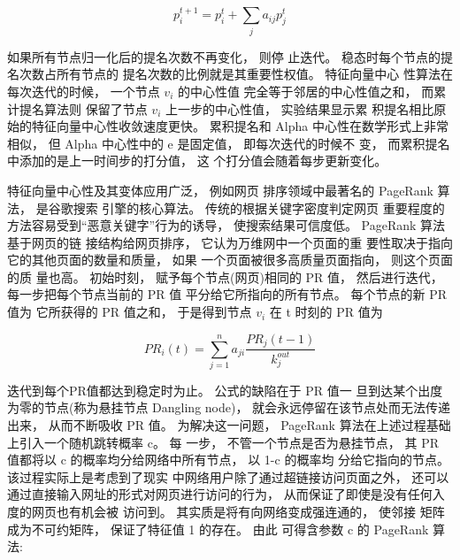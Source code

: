 \[p_i^{t + 1} = p_i^t + \sum\limits_j {{a_{ij}}p_j^t} \]

				如果所有节点归一化后的提名次数不再变化， 则停 止迭代。 稳态时每个节点的提名次数占所有节点的 提名次数的比例就是其重要性权值。 特征向量中心 性算法在每次迭代的时候， 一个节点 $v_i$ 的中心性值 完全等于邻居的中心性值之和， 而累计提名算法则 保留了节点 $v_i$ 上一步的中心性值， 实验结果显示累 积提名相比原始的特征向量中心性收敛速度更快。 累积提名和 Alpha 中心性在数学形式上非常相似， 但 Alpha 中心性中的 e 是固定值， 即每次迭代的时候不 变， 而累积提名中添加的是上一时间步的打分值， 这 个打分值会随着每步更新变化。

				特征向量中心性及其变体应用广泛， 例如网页 排序领域中最著名的 PageRank 算法， 是谷歌搜索 引擎的核心算法。 传统的根据关键字密度判定网页 重要程度的方法容易受到“恶意关键字”行为的诱导， 使搜索结果可信度低。 PageRank 算法基于网页的链 接结构给网页排序， 它认为万维网中一个页面的重 要性取决于指向它的其他页面的数量和质量， 如果 一个页面被很多高质量页面指向， 则这个页面的质 量也高。 初始时刻， 赋予每个节点(网页)相同的 PR 值， 然后进行迭代， 每一步把每个节点当前的 PR 值 平分给它所指向的所有节点。 每个节点的新 PR 值为 它所获得的 PR 值之和， 于是得到节点 $v_i$ 在 t 时刻的 PR 值为

\[P{R_i}(t) = \sum\limits_{j = 1}^n {{a_{ji}}\frac{{P{R_j}(t - 1)}}{{k_j^{out}}}} \]

				迭代到每个PR值都达到稳定时为止。 公式的缺陷在于 PR 值一 旦到达某个出度为零的节点(称为悬挂节点 Dangling node)， 就会永远停留在该节点处而无法传递出来， 从而不断吸收 PR 值。 为解决这一问题， PageRank 算法在上述过程基础上引入一个随机跳转概率 c。 每 一步， 不管一个节点是否为悬挂节点， 其 PR 值都将以 c 的概率均分给网络中所有节点， 以 1-c 的概率均 分给它指向的节点。 该过程实际上是考虑到了现实 中网络用户除了通过超链接访问页面之外， 还可以 通过直接输入网址的形式对网页进行访问的行为， 从而保证了即使是没有任何入度的网页也有机会被 访问到。 其实质是将有向网络变成强连通的， 使邻接 矩阵成为不可约矩阵， 保证了特征值 1 的存在。 由此 可得含参数 c 的 PageRank 算法:


